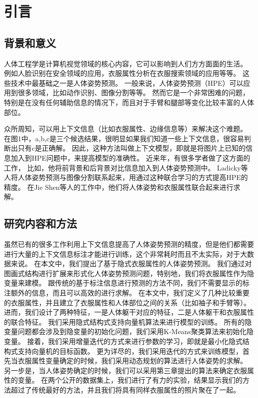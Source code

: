 
\chapter{引言}
\label{chap:intro}

\section{背景和意义}
人体工程学是计算机视觉领域的核心内容，它可以影响到人们方方面面的生活。
例如人脸识别在安全领域的应用，衣服属性分析在衣服搜索领域的应用等等。
这些技术中最基础之一是人体姿势预测。
一般来说，人体姿势预测（HPE）可以应用到很多领域，比如动作识别、图像分割等等。
然而它是一个非常困难的问题，特别是在没有任何辅助信息的情况下，而且对于手臂和腿部等变化比较丰富的人体部位。

众所周知，可以用上下文信息（比如衣服属性、边缘信息等）来解决这个难题。
在图1中，a,b,c是三个候选结果，很明显如果我们知道一些上下文信息，很容易判断出只有c是正确解。
因此，这种方法叫做上下文模型，即就是将图片上已知的信息加入到HPE问题中，来提高模型的准确性。
近来年，有很多学者做了这方面的工作\cite{deeppose,cvpr09}， 比如\cite{deeppose}，他将前背景和后背景对比信息加入到人体姿势预测中。
Ladicky\cite{cvpr09}等人将人体姿势预测与图像分割联系起来，用通过这种联合学习的方式提高HPE的精度。
在Jie Shen\cite{shen2014unified}等人的工作中，他们将人体姿势和衣服属性联合起来进行求解\cite{cvpr09}。

\section{研究内容和方法}
虽然已有的很多工作利用上下文信息提高了人体姿势预测的精度，但是他们都需要进行大量的上下文信息标注才能进行训练，这个非常耗时而且不太实际，对于大数据来说。
在本文中，我们提出了基于隐式衣服属性的人体姿势预测。
我们通过对图画式结构进行扩展来形式化人体姿势预测问题，特别地，我们将衣服属性作为隐变量来建模。
跟传统的基于标注信息进行预测的方法不同，我们不需要显示的标注额外的信息，而且可以高效的进行求解。
在本文中，我们定义了几种比较重要的衣服属性，并且建立了衣服属性和人体部位之间的关系（比如袖子和手臂等）。
进而，我们设计了两种特征，一是人体躯干对应的特征，二是人体躯干和衣服属性的联合特征。
我们采用隐式结构式支持向量机算法来进行模型的训练。
所有的隐变量问题都会涉及到隐变量的初始化问题，我们采用K-Means聚类算法来初始化隐变量。
接着，我们采用增量迭代的方式来进行参数的学习，即就是最小化隐式结构式支持向量机的目标函数。
更为详尽的，我们采用迭代的方式来训练模型，首先当衣服属性变量确定的时候，我们采用动态规划的算法进行人体姿势的求解。
另一步是，当人体姿势确定的时候，我们可以采用第三章提出的算法来确定衣服属性的变量。
在两个公开的数据集上，我们进行了有力的实验，结果显示我们的方法超过了传统最好的方法，并且我们将具有同样衣服属性的照片聚在了一起。

